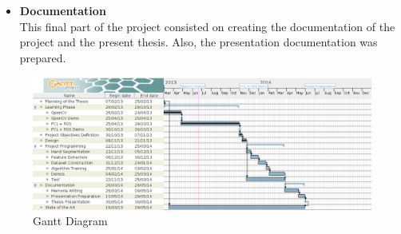 \begin{appendices}
\begin {itemize}
 	\item{\textbf{Documentation}}\\
 	This final part of the project consisted on creating the documentation of the project and the present thesis. Also, the presentation documentation was prepared. 
 	\\
 \end{itemize}

\begin{figure}[h]
	\centering
    \includegraphics[scale=0.5, angle=90]{img/gantt.eps}
	\caption[Gantt Diagram]{Gantt Diagram}	
\end{figure}

\end{appendices}